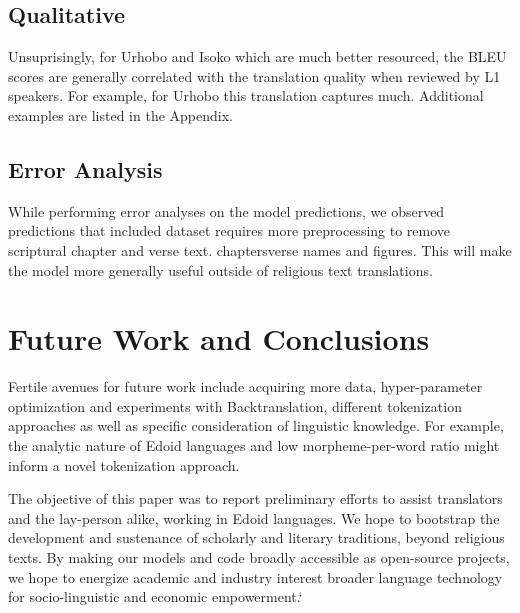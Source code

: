\documentclass{article} %
\begin{document}
\subsection{Qualitative}

Unsuprisingly, for Urhobo and Isoko which are much better resourced, the BLEU scores are generally correlated with the translation quality when reviewed by L1 speakers. For example, for Urhobo this translation captures much. Additional examples are listed in the Appendix.

\subsection{Error Analysis}
While performing error analyses on the model predictions, we observed predictions that included  dataset requires more preprocessing to remove scriptural chapter and verse text.  chapters\/verse names and figures. This will make the model more generally useful outside of religious text translations.

\section{Future Work and Conclusions}
Fertile avenues for future work include acquiring more data, hyper-parameter optimization and experiments with Backtranslation, different tokenization approaches as well as specific consideration of linguistic knowledge. For example, the analytic nature of Edoid languages and low morpheme-per-word ratio might inform a novel tokenization approach.

 The objective of this paper was to report preliminary efforts to assist translators and the lay-person alike, working in Edoid languages. We hope to bootstrap the development and sustenance of scholarly and literary traditions, beyond religious texts. By making our models and code broadly accessible as open-source projects, we hope to energize academic and industry interest broader language technology for socio-linguistic and economic empowerment.`
 
% 
\end{document}
